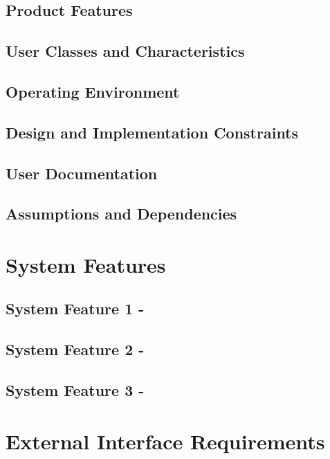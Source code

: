 \documentclass[10pt, a4paper, onecolumn]{scrartcl}
\begin{document}
		\subsection{Product Features}
		
		\subsection{User Classes and Characteristics}
		
		\subsection{Operating Environment}
		
		\subsection{Design and Implementation Constraints}
		
		\subsection{User Documentation}
		
		\subsection{Assumptions and Dependencies}
	
	\section{System Features}
	
		\subsection{System Feature 1 - }
		
		\subsection{System Feature 2 - }
		
		\subsection{System Feature 3 - }
	
	\section{External Interface Requirements}
	
\end{document}
